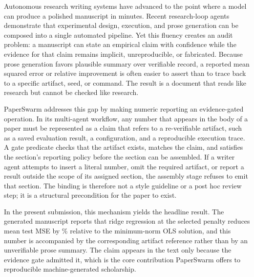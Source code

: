 Autonomous research writing systems have advanced to the point where a model can produce a polished manuscript in minutes. Recent research-loop agents \citep{xia2026researchloop,ren2026evigraph,luo2026xscientist} demonstrate that experimental design, execution, and prose generation can be composed into a single automated pipeline. Yet this fluency creates an audit problem: a manuscript can state an empirical claim with confidence while the evidence for that claim remains implicit, unreproducible, or fabricated. Because prose generation favors plausible summary over verifiable record, a reported mean squared error or relative improvement is often easier to assert than to trace back to a specific artifact, seed, or command. The result is a document that reads like research but cannot be checked like research.

PaperSwarm addresses this gap by making numeric reporting an evidence-gated operation. In its multi-agent workflow, any number that appears in the body of a paper must be represented as a claim that refers to a re-verifiable artifact, such as a saved evaluation result, a configuration, and a reproducible execution trace. A gate predicate checks that the artifact exists, matches the claim, and satisfies the section's reporting policy before the section can be assembled. If a writer agent attempts to insert a literal number, omit the required artifact, or report a result outside the scope of its assigned section, the assembly stage refuses to emit that section. The binding is therefore not a style guideline or a post hoc review step; it is a structural precondition for the paper to exist.

In the present submission, this mechanism yields the headline result. The generated manuscript reports that ridge regression at the selected penalty reduces mean test MSE by \% relative to the minimum-norm OLS solution, and this number is accompanied by the corresponding artifact reference rather than by an unverifiable prose summary. The claim appears in the text only because the evidence gate admitted it, which is the core contribution PaperSwarm offers to reproducible machine-generated scholarship.
